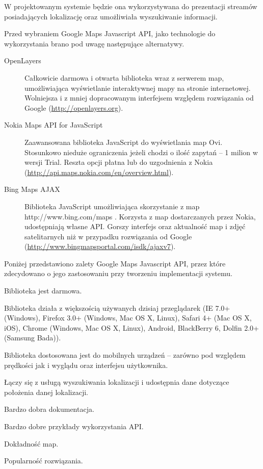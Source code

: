 W projektowanym systemie będzie ona wykorzystywana do prezentacji streamów posiadających lokalizację oraz umożliwiała wyszukiwanie informacji.

Przed wybraniem Google Maps Javascript API, jako technologie do wykorzystania brano pod uwagę następujące alternatywy.
\begin{description}
    \item[OpenLayers] Całkowicie darmowa i otwarta biblioteka wraz z serwerem map, umożliwiająca wyświetlanie interaktywnej mapy na stronie internetowej. Wolniejsza i z mniej dopracowanym interfejsem względem rozwiązania od Google (\url{http://openlayers.org}).
    \item[Nokia Maps API for JavaScript] Zaawansowana biblioteka JavaScript do wyświetlania map Ovi. Stosunkowo nieduże ograniczenia jeżeli chodzi o ilość zapytań -- 1 milion w wersji Trial. Reszta opcji płatna lub do uzgodnienia z Nokia (\url{http://api.maps.nokia.com/en/overview.html}).
    \item[Bing Maps AJAX] Biblioteka JavaScript umożliwiająca skorzystanie z map http://www.bing.com/maps . Korzysta z map dostarczanych przez Nokia, udostępniają własne API. Gorszy interfejs oraz aktualność map i zdjęć satelitarnych niż w przypadku rozwiązania od Google (\url{http://www.bingmapsportal.com/isdk/ajaxv7}).
\end{description}

Poniżej przedstawiono zalety Google Maps Javascript API, przez które zdecydowano o jego zastosowaniu przy tworzeniu implementacji systemu.
\begin{packed_item}
    \item{Biblioteka jest darmowa.}
    \item{Biblioteka działa z większością używanych dzisiaj przeglądarek (IE 7.0+ (Windows), Firefox 3.0+ (Windows, Mac OS X, Linux), Safari 4+ (Mac OS X, iOS), Chrome (Windows, Mac OS X, Linux), Android, BlackBerry 6, Dolfin 2.0+ (Samsung Bada)).}
    \item{Biblioteka dostosowana jest do mobilnych urządzeń -- zarówno pod względem prędkości jak i wyglądu oraz interfejsu użytkownika.}
    \item{Łączy się z usługą wyszukiwania lokalizacji i udostępnia dane dotyczące położenia danej lokalizacji.}
    \item{Bardzo dobra dokumentacja.}
    \item{Bardzo dobre przykłady wykorzystania API.}
    \item{Dokładność map.}
    \item{Popularność rozwiązania.}
\end{packed_item}

